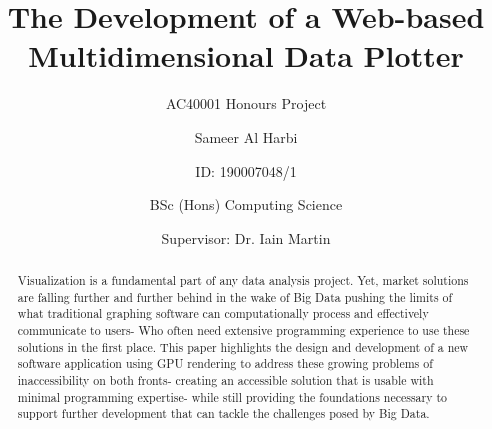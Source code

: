 \title{The Development of a Web-based Multidimensional Data Plotter}
\subtitle{AC40001 Honours Project}



\author{Sameer Al Harbi}
\author[0]{ID: 190007048/1}
\author[1]{BSc (Hons) Computing Science}
\author[2]{Supervisor: Dr. Iain Martin}
\date{}




\begin{abstract}
  Visualization is a fundamental part of any data analysis project. Yet, market solutions are falling further and further behind in the wake of Big Data pushing the limits of what traditional graphing software can computationally process and effectively communicate to users- Who often need extensive programming experience to use these solutions in the first place. This paper highlights the design and development of a new software application using GPU rendering to address these growing problems of inaccessibility on both fronts- creating an accessible solution that is usable with minimal programming expertise- while still providing the foundations necessary to support further development that can tackle the challenges posed by Big Data.
\end{abstract}